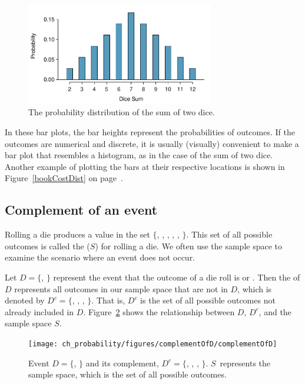 \begin{figure}
\centering
\includegraphics[width=0.73\textwidth]{ch_probability/figures/diceSumDist/diceSumDist}
\caption{The probability distribution of the sum of two dice.}
\label{diceSumDist}
\end{figure}

In these bar plots, the bar heights represent the probabilities of outcomes. If the outcomes are numerical and discrete, it is usually (visually) convenient to make a bar plot that resembles a histogram, as in the case of the sum of two dice. Another example of plotting the bars at their respective locations is shown in Figure~\ref{bookCostDist} on page~\pageref{bookCostDist}.

\subsection{Complement of an event}

Rolling a die produces a value in the set $\{$, , , , , $\}$. This set of all possible outcomes is called the  ($S$) for rolling a die. We often use the sample space to examine the scenario where an event does not occur.

Let $D=\{$, $\}$ represent the event that the outcome of a die roll is  or . Then the  of $D$ represents all outcomes in our sample space that are not in $D$, which is denoted by $D^c = \{$, , , $\}$. That is, $D^c$ is the set of all possible outcomes not already included in $D$. Figure~\ref{complementOfD} shows the relationship between $D$, $D^c$, and the sample space $S$. 

\begin{figure}[hht]
\centering
\texttt{[image: ch\_probability/figures/complementOfD/complementOfD]}
\caption{Event $D=\{$, $\}$ and its complement, $D^c = \{$, , , $\}$. $S$~represents the sample space, which is the set of all possible outcomes.}
\label{complementOfD}
\end{figure}

